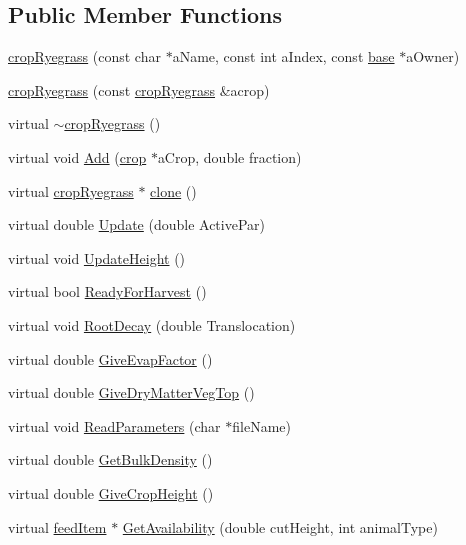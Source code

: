 \subsection*{Public Member Functions}
\begin{DoxyCompactItemize}
\item 
\hyperlink{classcrop_ryegrass_a39d6d74db795bf6cf394ab5f055dbb2a}{cropRyegrass} (const char $\ast$aName, const int aIndex, const \hyperlink{classbase}{base} $\ast$aOwner)
\item 
\hyperlink{classcrop_ryegrass_aeea36991d9749de3448b4c60d1338bd5}{cropRyegrass} (const \hyperlink{classcrop_ryegrass}{cropRyegrass} \&acrop)
\item 
virtual \hyperlink{classcrop_ryegrass_a807136660c42b9bc34009d182037893c}{$\sim$cropRyegrass} ()
\item 
virtual void \hyperlink{classcrop_ryegrass_a3ee92e29d981a5bcae487e10f5aa18d4}{Add} (\hyperlink{classcrop}{crop} $\ast$aCrop, double fraction)
\item 
virtual \hyperlink{classcrop_ryegrass}{cropRyegrass} $\ast$ \hyperlink{classcrop_ryegrass_af7eb9cc81f755e89fc1486cc242b8b84}{clone} ()
\item 
virtual double \hyperlink{classcrop_ryegrass_a6785773151146d1e49ec5bb5c75636aa}{Update} (double ActivePar)
\item 
virtual void \hyperlink{classcrop_ryegrass_a73b6ee5b772c6748d37be7d006a092c6}{UpdateHeight} ()
\item 
virtual bool \hyperlink{classcrop_ryegrass_a621ec6683bbbf9ff717db7c9a428e722}{ReadyForHarvest} ()
\item 
virtual void \hyperlink{classcrop_ryegrass_a7b2e92086e8aa5ae0d41c5b7e7678181}{RootDecay} (double Translocation)
\item 
virtual double \hyperlink{classcrop_ryegrass_a8c82f3380064d4351d60aada56820cf4}{GiveEvapFactor} ()
\item 
virtual double \hyperlink{classcrop_ryegrass_aedd4ae77832a94a71902085022f1eb88}{GiveDryMatterVegTop} ()
\item 
virtual void \hyperlink{classcrop_ryegrass_a0bcd3f5b23b82810d40e2bf089755447}{ReadParameters} (char $\ast$fileName)
\item 
virtual double \hyperlink{classcrop_ryegrass_af6202e05ea5e0c9b91acd3deea308a24}{GetBulkDensity} ()
\item 
virtual double \hyperlink{classcrop_ryegrass_ad5e9c54a99aa929e1ecab9c7146b6b09}{GiveCropHeight} ()
\item 
virtual \hyperlink{classfeed_item}{feedItem} $\ast$ \hyperlink{classcrop_ryegrass_a3907b56b9f463da7667d89f726543ef5}{GetAvailability} (double cutHeight, int animalType)

\end{DoxyCompactItemize}
